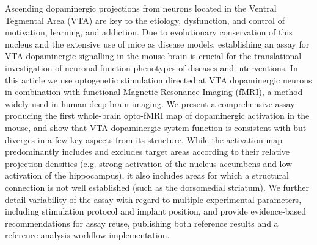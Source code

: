 Ascending dopaminergic projections from neurons located in the Ventral Tegmental Area (VTA) are key to the etiology, dysfunction, and control of motivation, learning, and addiction.
Due to evolutionary conservation of this nucleus and the extensive use of mice as disease models, establishing an assay for VTA dopaminergic signalling in the mouse brain is crucial for the translational investigation of neuronal function phenotypes of diseases and interventions.
In this article we use optogenetic stimulation directed at VTA dopaminergic neurons in combination with functional Magnetic Resonance Imaging (fMRI), a method widely used in  human deep brain imaging.
We present a comprehensive assay producing the first whole-brain opto-fMRI map of dopaminergic activation in the mouse, and show that VTA dopaminergic system function is consistent with but diverges in a few key aspects from its structure.
While the activation map predominantly includes and excludes target areas according to their relative projection densities (e.g. strong activation of the nucleus accumbens and low activation of the hippocampus), it also includes areas for which a structural connection is not well established (such as the dorsomedial striatum).
We further detail variability of the assay with regard to multiple experimental parameters, including stimulation protocol and implant position, and provide evidence-based recommendations for assay reuse, publishing both reference results and a reference analysis workflow implementation.
